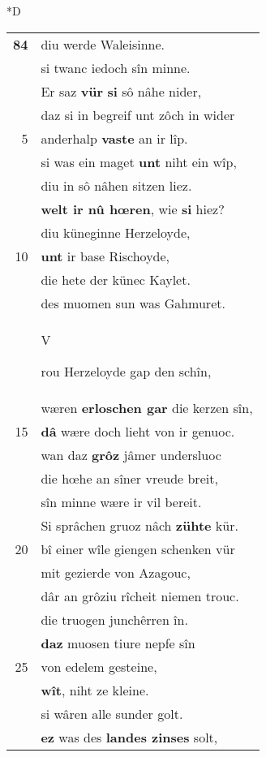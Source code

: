 \documentclass[8pt,a4paper,notitlepage]{article}
\begin{document}
\begin{table}[ht]
\begin{minipage}[t]{0.5\linewidth}
\small
\begin{center}*D
\end{center}
\begin{tabular}{rl}
\textbf{84} & diu werde Waleisinne.\\ 
 & si twanc iedoch sîn minne.\\ 
 & Er saz \textbf{vür} \textbf{si} sô nâhe nider,\\ 
 & daz si in begreif unt zôch in wider\\ 
5 & anderhalp \textbf{vaste} an ir lîp.\\ 
 & si was ein maget \textbf{unt} niht ein wîp,\\ 
 & diu in sô nâhen sitzen liez.\\ 
 & \textbf{welt ir nû hœren}, wie \textbf{si} hiez?\\ 
 & diu küneginne Herzeloyde,\\ 
10 & \textbf{unt} ir base Rischoyde,\\ 
 & die hete der künec Kaylet.\\ 
 & des muomen sun was Gahmuret.\\ 
 & \begin{large}V\end{large}rou Herzeloyde gap den schîn,\\ 
 & wæren \textbf{erloschen gar} die kerzen sîn,\\ 
15 & \textbf{dâ} wære doch lieht von ir genuoc.\\ 
 & wan daz \textbf{grôz} jâmer undersluoc\\ 
 & die hœhe an sîner vreude breit,\\ 
 & sîn minne wære ir vil bereit.\\ 
 & Si sprâchen gruoz nâch \textbf{zühte} kür.\\ 
20 & bî einer wîle giengen schenken vür\\ 
 & mit gezierde von Azagouc,\\ 
 & dâr an grôziu rîcheit niemen trouc.\\ 
 & die truogen junchêrren în.\\ 
 & \textbf{daz} muosen tiure nepfe sîn\\ 
25 & von edelem gesteine,\\ 
 & \textbf{wît}, niht ze kleine.\\ 
 & si wâren alle sunder golt.\\ 
 & \textbf{ez} was des \textbf{landes zinses} solt,\\ 

\end{tabular}
\end{minipage}
\end{table}
\end{document}
